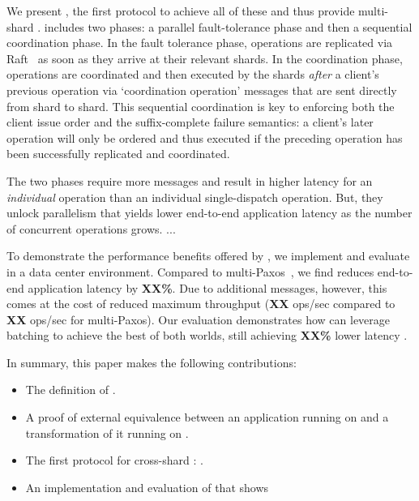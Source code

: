We present \sys{}, the first protocol to achieve all of these and thus
provide multi-shard \mdl{}.
\sys{} includes two phases: a parallel fault-tolerance phase and then a sequential coordination phase.
In the fault tolerance phase, operations are replicated via Raft~\cite{ongaro2014raft} as soon as they arrive at their relevant shards.
In the coordination phase, operations are coordinated and then executed by the shards \textit{after} a client's previous operation via `coordination operation' messages that are sent directly from shard to shard.
This sequential coordination is key to enforcing both the client issue order and the suffix-complete failure semantics:
a client's later operation will only be ordered and thus executed if the preceding operation has been successfully replicated and coordinated.

The two phases require more messages and result in higher latency for an \textit{individual} operation than an individual single-dispatch operation.
But, they unlock parallelism that yields lower end-to-end application latency as the number of concurrent operations grows.
...

%



To demonstrate the performance benefits offered by \MDL{},
we implement and evaluate \sys{} in a data center environment.
Compared to multi-Paxos~\cite{lamport1998paxos}, we find \sys{}
reduces end-to-end application latency by \textbf{XX\%}. Due to
additional messages, however, this comes at the cost of reduced
maximum throughput (\textbf{XX} ops/sec compared to \textbf{XX}
ops/sec for multi-Paxos). Our evaluation demonstrates how \sys{} can leverage
batching to achieve the best of both worlds, still achieving
\textbf{XX\%} lower latency .

In summary, this paper makes the following contributions:
\begin{itemize}[leftmargin=*]
\item The definition of \mdllong{}.
\item A proof of external equivalence between an application running on \sdl{} and a transformation of it running on \mdl{}.
\item The first protocol for cross-shard \mdl{}: \sys{}.
\item An implementation and evaluation of \sys{} that shows 
\end{itemize}

